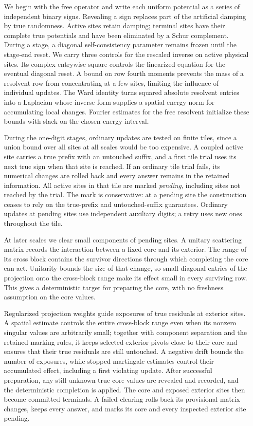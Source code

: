 We begin with the free operator and write each uniform potential as a
series of independent binary signs. Revealing a sign replaces part of
the artificial damping by true randomness. Active sites retain damping;
terminal sites have their complete true potentials and have been
eliminated by a Schur complement. During a stage, a diagonal
self-consistency parameter remains frozen until the stage-end reset.
We carry three controls for the rescaled inverse on active physical
sites. Its complex entrywise square controls the linearized equation
for the eventual diagonal reset. A bound on row fourth moments prevents
the mass of a resolvent row from concentrating at a few sites, limiting
the influence of individual updates. The Ward identity turns squared
absolute resolvent entries into a Laplacian whose inverse form supplies
a spatial energy norm for
accumulating local changes. Fourier estimates for the free resolvent
initialize these bounds with slack on the chosen energy interval.

During the one-digit stages, ordinary updates are tested on finite
tiles, since a union bound over all sites at all scales would be too
expensive. A coupled active site carries a true prefix with an
untouched suffix, and a first tile trial
uses its next true sign when that site is reached. If an ordinary tile
trial fails, its numerical changes are rolled back and every answer remains in the
retained information. All active sites in that tile are marked
\emph{pending}, including sites not reached by the trial. The mark is
conservative: at a pending site the construction ceases to rely on the
true-prefix and untouched-suffix guarantees. Ordinary updates at
pending sites use independent auxiliary digits; a retry uses new ones
throughout the tile.

At later scales we clear small components of pending sites. A unitary
scattering matrix records the interaction between a fixed core and its
exterior. The range of its cross block contains the survivor directions
through which completing the core can act. Unitarity bounds the size
of that change, so small diagonal entries of the projection onto the
cross-block range make its effect small in every surviving row. This
gives a deterministic target for preparing the core, with no freshness
assumption on the core values.

Regularized projection weights guide exposures of true residuals at
exterior sites. A spatial estimate controls the entire cross-block
range even when its nonzero singular values are arbitrarily small;
together with component separation and the retained marking rules, it
keeps selected exterior pivots close to their core and ensures that
their true residuals are still untouched. A negative drift
bounds the number of exposures, while stopped martingale estimates
control their accumulated effect, including a first violating update.
After successful preparation, any still-unknown true core values are
revealed and recorded, and the deterministic completion is applied.
The core and exposed exterior sites then become committed terminals.
A failed clearing rolls back its provisional matrix changes, keeps
every answer, and marks its core and every inspected exterior site pending.

